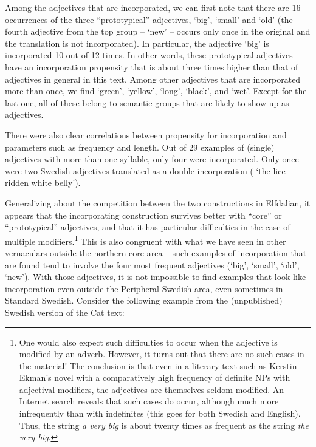 Among the adjectives that are incorporated, we can first note that there are 16 occurrences of the three “prototypical” adjectives,  ‘big’,  ‘small’ and ‘old’ (the fourth adjective from the top group –  ‘new’ – occurs only once in the original and the translation is not incorporated). In particular, the adjective  ‘big’ is incorporated 10 out of 12 times. In other words, these prototypical adjectives have an incorporation propensity that is about three times higher than that of adjectives in general in this text. Among other adjectives that are incorporated more than once, we find  ‘green’,  ‘yellow’,  ‘long’,  ‘black’, and  ‘wet’. Except for the last one, all of these belong to semantic groups that are likely to show up as adjectives.

There were also clear correlations between propensity for incorporation and parameters such as frequency and length. Out of 29 examples of (single) adjectives with more than one syllable, only four were incorporated. Only once were two Swedish adjectives translated as a double incorporation ( ‘the lice-ridden white belly’).

Generalizing about the competition between the two constructions in Elfdalian, it appears that the incorporating construction survives better with “core” or “prototypical” adjectives, and that it has particular difficulties in the case of multiple modifiers.\footnote{ One would also expect such difficulties to occur when the adjective is modified by an adverb. However, it turns out that there are no such cases in the material! The conclusion is that even in a literary text such as Kerstin Ekman’s novel with a comparatively high frequency of definite NPs with adjectival modifiers, the adjectives are themselves seldom modified. An Internet search reveals that such cases do occur, although much more infrequently than with indefinites (this goes for both Swedish and English). Thus, the string \textit{a very big} is about twenty times as frequent as the string \textit{the very big}.} This is also congruent with what we have seen in other vernaculars outside the northern core area – such examples of incorporation that are found tend to involve the four most frequent adjectives (‘big’, ‘small’, ‘old’, ‘new’). With those adjectives, it is not impossible to find examples that look like incorporation even outside the Peripheral Swedish area, even sometimes in Standard Swedish. Consider the following example from the (unpublished) Swedish version of the Cat text:

